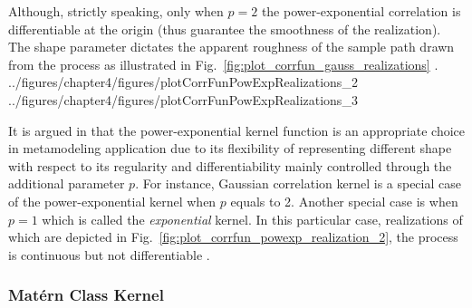 Although, strictly speaking, only when $p = 2$ the power-exponential correlation is differentiable at the origin (thus guarantee the smoothness of the realization).
The shape parameter dictates the apparent roughness of the sample path drawn from the process as illustrated in Fig.~\ref{fig:plot_corrfun_gauss_realizations} \cite{Rasmussen2006}.
{../figures/chapter4/figures/plotCorrFunPowExpRealizations_2}
{../figures/chapter4/figures/plotCorrFunPowExpRealizations_3}

It is argued in \cite{Marrel2008} that the power-exponential kernel function is an appropriate choice in metamodeling application due to its flexibility of representing different shape with respect to its regularity and differentiability mainly controlled through the additional parameter $p$.
For instance, Gaussian correlation kernel is a special case of the power-exponential kernel when $p$ equals to 2. 
Another special case is when $p = 1$ which is called the \emph{exponential} kernel.
In this particular case, realizations of which are depicted in Fig.~\ref{fig:plot_corrfun_powexp_realization_2}, the process is continuous but not differentiable \cite{Rasmussen2006}.

\subsubsection{Mat\'ern Class Kernel}\label{subsub:gp_matern_cov}

